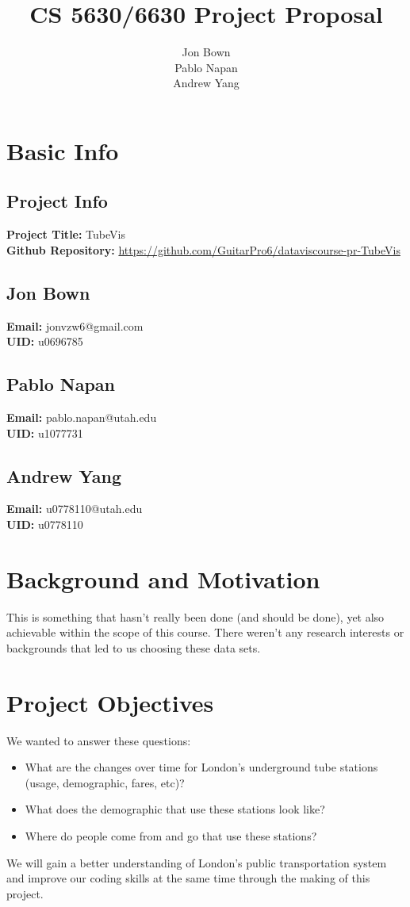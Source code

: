 \documentclass[11pt]{article} %
\title{CS 5630/6630 Project Proposal}
\author{Jon Bown \\ Pablo Napan \\ Andrew Yang}
\date{} %
\begin{document}
\maketitle

\section{Basic Info}
	\subsection{Project Info}
	\textbf{Project Title:} TubeVis \\
	\textbf{Github Repository:} \url{https://github.com/GuitarPro6/dataviscourse-pr-TubeVis}
	\subsection{Jon Bown}
	\textbf{Email:} jonvzw6@gmail.com\\
	\textbf{UID:} u0696785 
	\subsection{Pablo Napan}
	\textbf{Email:} pablo.napan@utah.edu\\
	\textbf{UID:} u1077731
	\subsection{Andrew Yang}
	\textbf{Email:} u0778110@utah.edu \\
	\textbf{UID:} u0778110

\section{Background and Motivation}
This is something that hasn't really been done (and should be done), yet also achievable within the scope of this course. There weren't any research interests or backgrounds that led to us choosing these data sets.

\section{Project Objectives}
We wanted to answer these questions:
\begin{itemize}
\item What are the changes over time for London's underground tube stations (usage, demographic, fares, etc)?
\item What does the demographic that use these stations look like?
\item Where do people come from and go that use these stations?
\end{itemize}
We will gain a better understanding of London's public transportation system and improve our coding skills at the same time through the making of this project.
\end{document}
